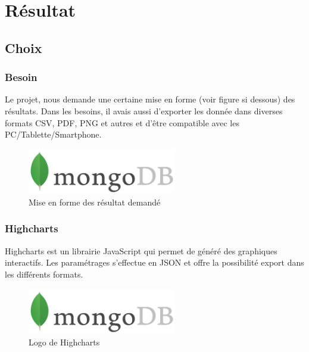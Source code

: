 \section{Résultat}

\subsection{Choix}

\subsubsection{Besoin}

Le projet, nous demande une certaine mise en forme (voir figure si dessous) des résultats. Dans les besoins, il avais aussi d'exporter les donnée dans diverses formats CSV, PDF, PNG et autres et d'être compatible avec les PC/Tablette/Smartphone.  

\begin{figure}[H]
    \begin{center}
    \includegraphics[height=2.0cm]{img/mongodb}
    \end{center}
    \caption{Mise en forme des résultat demandé}
\end{figure}

\subsubsection{Highcharts}

Highcharts est un librairie JavaScript qui permet de généré des graphiques interactifs. Les paramétrages s'effectue en JSON et offre la possibilité export dans les différents formats.

\begin{figure}[H]
    \begin{center}
    \includegraphics[height=2.0cm]{img/mongodb}
    \end{center}
    \caption{Logo de Highcharts}
\end{figure}

